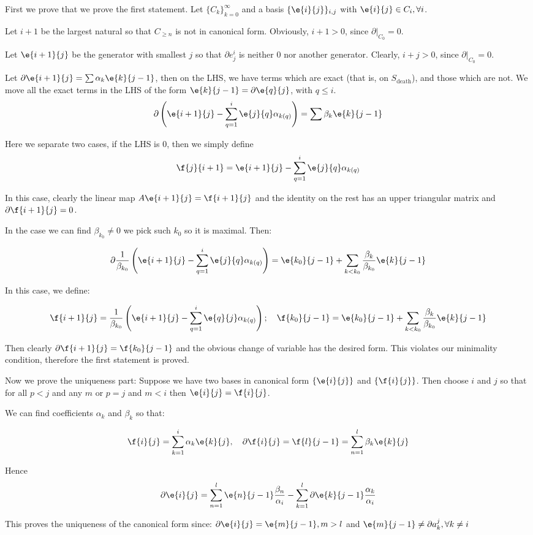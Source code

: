 \begin{prof}
First we prove that we prove the first statement. 
Let $\{C_k\}_{k=0}^\infty$ 
and a basis $\{\e{i}{j}\}_{i,j}$ 
with $\e{i}{j}\in C_i,\forall i$.

Let $i+1$ be the largest natural so that $C_{\geq n}$
is not in canonical form. Obviously, $i+1>0$, since $\partial | _{C_0}=0$.

Let $\e{i+1}{j}$ be the generator with smallest $j$ so that $\partial e^i_j$
is neither 0 nor another generator. Clearly, $i+j>0$, since $\partial | _{C_0}=0$.
	
Let $\partial \e{i+1}{j}=\sum \alpha_k \e{k}{j-1}$, then on the LHS, we have terms which are exact (that is, on $S_{\text{death}}$),
and those which are not. We move all the exact terms in the LHS of the form $\e{k}{j-1}=\partial \e{q}{j}$, with $q\leq i$.
$$
\partial\left(
\e{i+1}{j}
-
\sum_{q=1}^i
\e{j}{q}\alpha_{k(q)}
\right)
=
\sum \beta_k \e{k}{j-1}
$$

Here we separate two cases,
if the LHS is $0$, then we simply define 
$$
\f{j}{i+1}=
\e{i+1}{j}
-
\sum_{q=1}^i
\e{j}{q}\alpha_{k(q)}
$$

In this case, clearly the linear map $A \e{i+1}{j}=\f{i+1}{j}$ and the identity on the rest 
has an upper triangular matrix and $\partial \f{i+1}{j}=0$.

In the case we can find $\beta_{k_0}\neq 0 $ we pick such $k_0$ so it is maximal. Then:

$$
\partial
\frac{1}{\beta_{k_0}}
\left(
\e{i+1}{j}
-
\sum_{q=1}^i
\e{j}{q}\alpha_{k(q)}
\right)
=
\e{k_0}{j-1}
+
\sum_{k<k_0} \frac{\beta_k}{\beta_{k_0}} \e{k}{j-1}
$$

In this case, we define:

$$
\f{i+1}{j}
=
\frac{1}{\beta_{k_0}}
\left(
\e{i+1}{j}
-
\sum_{q=1}^i
\e{q}{j}\alpha_{k(q)}
\right);
\quad
\f{k_{0}}{j-1}
=
\e{k_0}{j-1}
+
\sum_{k<k_0} \frac{\beta_k}{\beta_{k_0}} \e{k}{j-1}
$$

Then clearly $\partial \f{i+1}{j}=\f{k_0}{j-1}$ and the obvious change of variable has the desired form.
This violates our minimality condition, therefore the first statement is proved.

Now we prove the uniqueness part: Suppose we have two bases in canonical form
$\{\e{i}{j}\}$ and $\{\f{i}{j}\}$. Then choose $i$ and $j$ so that for all $p<j$ and any $m$
or $p=j$ and $m<i$ then $\e{i}{j}=\f{i}{j}$. 

We can find coefficients $\alpha_k$ and $\beta_k$ so that:

$$
\f{i}{j}
=
\sum_{k=1}^i \alpha_k \e{k}{j},
\quad
\partial \f{i}{j} = \f{l}{j-1}
=
\sum_{n=1}^l \beta_k \e{k}{j}
$$

Hence 
$$
\partial \e{i}{j}=
\sum_{n=1}^l
\e{n}{j-1}\frac{\beta_n}{\alpha_i}
-
\sum_{k=1}^l
\partial \e{k}{j-1}\frac{\alpha_k}{\alpha_i}
$$

This proves the uniqueness of the canonical form since: $\partial \e{i}{j}=\e{m}{j-1},m>l$ and 
$\e{m}{j-1}\neq \partial a_k^j, \forall k\neq i$
 
\end{prof}

